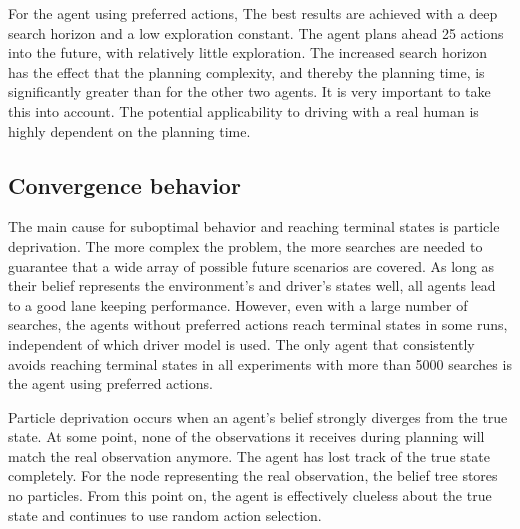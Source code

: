 
For the agent using preferred actions, The best results are achieved with a deep search horizon and a low exploration constant. The agent plans ahead 25 actions into the future, with relatively little exploration. The increased search horizon has the effect that the planning complexity, and thereby the planning time, is significantly greater than for the other two agents. It is very important to take this into account. The potential applicability to driving with a real human is highly dependent on the planning time.

\subsection{Convergence behavior}

The main cause for suboptimal behavior and reaching terminal states is particle deprivation. The more complex the problem, the more searches are needed to guarantee that a wide array of possible future scenarios are covered. As long as their belief represents the environment's and driver's states well, all agents lead to a good lane keeping performance. However, even with a large number of searches, the agents without preferred actions reach terminal states in some runs, independent of which driver model is used. The only agent that consistently avoids reaching terminal states in all experiments with more than 5000 searches is the agent using preferred actions. 

Particle deprivation occurs when an agent's belief strongly diverges from the true state. At some point, none of the observations it receives during planning will match the real observation anymore. The agent has lost track of the true state completely. For the node representing the real observation, the belief tree stores no particles. From this point on, the agent is effectively clueless about the true state and continues to use random action selection.



